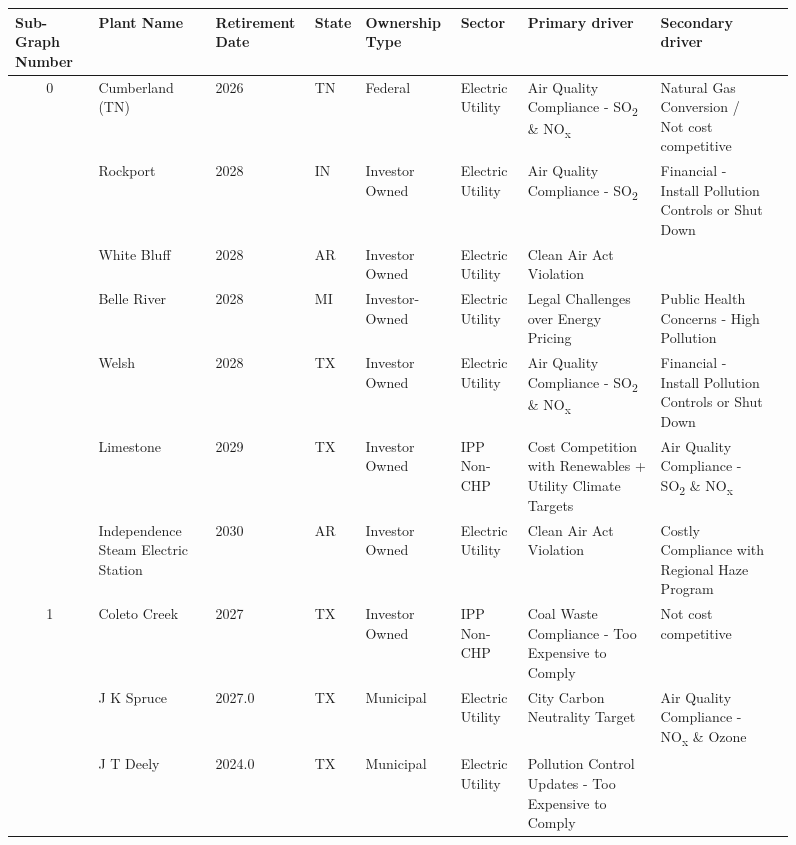 \begin{figure}[H]
    \begin{minipage}{1\textwidth}
        \begin{adjustbox}{width=\textwidth}
            \begin{small}
                \begin{tabular}{cllllllll}
                    \multicolumn{1}{l}{\textbf{Sub-Graph Number}} & Plant Name & Retirement Date & State & Ownership Type & Sector & Primary driver & Secondary driver \\
                    \midrule
                    \multirow{7}{*}{0} & Cumberland (TN) & 2026 & TN & Federal & Electric Utility & Air Quality Compliance - SO\textsubscript{2} \& NO\textsubscript{x} & Natural Gas Conversion / Not cost competitive  \\
                    & Rockport & 2028 & IN & Investor Owned & Electric Utility & Air Quality Compliance - SO\textsubscript{2} & Financial - Install Pollution Controls or Shut Down \\
                    & White Bluff & 2028 & AR & Investor Owned & Electric Utility & Clean Air Act Violation & \\
                    & Belle River & 2028 & MI & Investor-Owned & Electric Utility & Legal Challenges over Energy Pricing & Public Health Concerns - High Pollution \\
                    & Welsh & 2028 & TX & Investor Owned & Electric Utility & Air Quality Compliance - SO\textsubscript{2} \& NO\textsubscript{x} & Financial - Install Pollution Controls or Shut Down \\
                    & Limestone & 2029 & TX & Investor Owned & IPP Non-CHP & Cost Competition with Renewables + Utility Climate Targets & Air Quality Compliance - SO\textsubscript{2} \& NO\textsubscript{x} \\
                    & Independence Steam Electric Station & 2030 & AR & Investor Owned & Electric Utility & Clean Air Act Violation & Costly Compliance with Regional Haze Program \\
                    \midrule
                    \multirow{4}{*}{1} & Coleto Creek & 2027 & TX & Investor Owned & IPP Non-CHP & Coal Waste Compliance - Too Expensive to Comply & Not cost competitive \\
                    & J K Spruce & 2027.0 & TX & Municipal & Electric Utility & City Carbon Neutrality Target & Air Quality Compliance - NO\textsubscript{x} \& Ozone \\
                    & J T Deely & 2024.0 & TX & Municipal & Electric Utility & Pollution Control Updates - Too Expensive to Comply &  \\

\end{tabular}
\end{small}
\end{adjustbox}
\end{minipage}
\end{figure}
